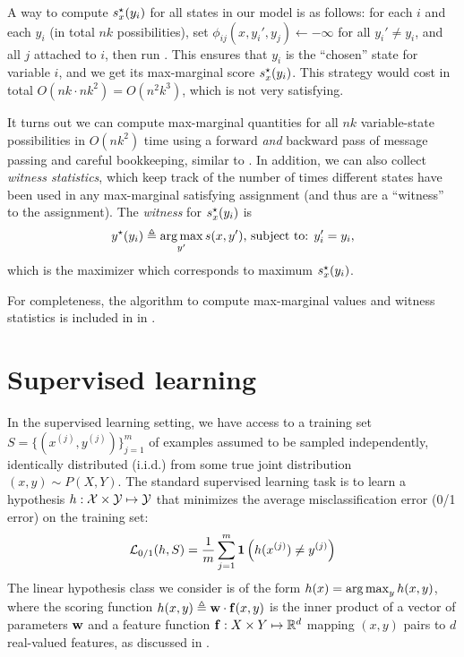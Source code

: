 A \naive way to compute $s^\star_x(y_i)$ for all states in our model is as follows: for 
each $i$ and each $y_i$ (in total $nk$ possibilities), set 
$\phi_{ij}(x,y_i',y_j) \leftarrow -\infty$ for all $y_i' \neq y_i$, and all $j$ 
attached to $i$, then run .  This ensures that $y_i$ is 
the ``chosen'' state for variable $i$, and we get its max-marginal score 
$s^\star_x(y_i)$.  This strategy would cost in total $O(nk \cdot nk^2) = O(n^2k^3)$, 
which is not very satisfying.

It turns out we can compute max-marginal quantities for all $nk$ variable-state 
possibilities in $O(nk^2)$ time using a forward {\em and } backward pass of 
message passing and careful bookkeeping, similar to .  In 
addition, we can also collect {\em witness statistics}, which keep track of the 
number of times different states have been used in any max-marginal satisfying 
assignment (and thus are a ``witness'' to the assignment).  The {\em witness} 
for $s^\star_x(y_i)$ is 
\begin{equation}
y^\star(y_i) \triangleq  \mathop{\arg\max}_{y'} s(x,y') \text{, subject to: } y_i' = y_i,
\end{equation}
which is the maximizer which corresponds to maximum $s^\star_x(y_i)$.  

For completeness, the algorithm to compute max-marginal values and witness 
statistics is included in  in .

\section{Supervised learning}\label{sec:learning}
In the supervised learning setting, we have access to a training set
$S = \{(x^{(j)},y^{(j)})\}_{j=1}^m$ of examples assumed to be sampled 
independently, identically distributed (i.i.d.) from some true joint 
distribution $(x,y) \sim P(X,Y)$. The standard supervised learning task is to 
learn a hypothesis $h: \mathcal{X} \times \mathcal{Y} \mapsto \mathcal{Y}$ that minimizes the average misclassification error (0/1 error) on the training set: 
\begin{align}
\mathcal{L}_{0/1}(h,S) = \frac{1}{m}\sum_{j=1}^m \mathbf{1}\left(h(x^{(j)}) \neq y^{(j)}\right)
\end{align}
The linear hypothesis class we consider is of the form $h(x) = \mathop{\arg\max}_y h(x,y)$, where the
scoring function $h(x,y) \triangleq \mathbf{w} \cdot \mathbf{f}(x,y)$ is the
inner product of a vector of parameters $\mathbf{w}$ and a feature
function $\mathbf{f}: X \times Y \mapsto \mathbb{R}^d$ mapping $(x,y)$ pairs to
$d$ real-valued features, as discussed in .  

